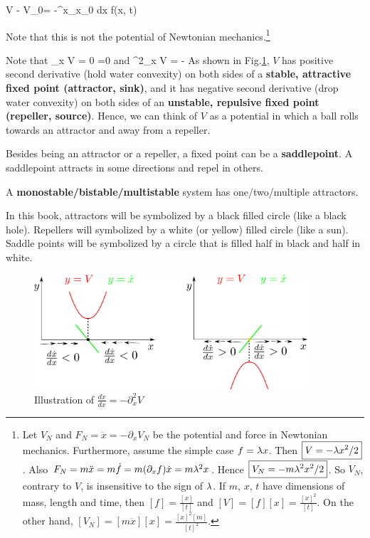 \beq
V - V_0= -\int^x_{x_0} dx \; f(x, t)
\eeq

Note that this is not the potential of Newtonian mechanics.\footnote{Let $V_N$ and $F_N=\ddot{x}=-\partial_x V_N$ be the potential and force in
Newtonian mechanics. Furthermore,
assume the simple case $f=\lambda x$. Then $\boxed{V=-\lambda x^2/2}$. Also
$F_N=m \ddot{x} =m\dot{f}=
m(\partial_x f )\dot{x}=
m\lambda^2 x$. Hence $\boxed{V_N = -m\lambda^2 x^2/2}$.
So $V_N$,
contrary to $V$, is insensitive to the sign of $\lambda$. If $m$, $x$, $t$ have
dimensions of mass, length and time, then
$[f]=\frac{[x]}{[t]}$ and $[V]=[f][x]=\frac{[x]^2}{[t]}$.
On the other hand, $[V_N]=[m\ddot{x}][x]=
\frac{[x]^2[m]}{[t]^2}$.
}



Note that
\beq
\partial_x V = 0 \iff {}=0
\eeq
and
\beq
\partial^2_x V = -
\eeq
As shown in Fig.\ref{fig-V-derivatives},
$V$ has positive second derivative
(hold water convexity)
on both sides of a {\bf stable, attractive fixed  point (attractor, sink)},
and it has negative second derivative
(drop water convexity)
on both sides of an {\bf unstable, repulsive fixed point (repeller, source)}. Hence, we can think of
$V$ as a potential in which a ball rolls towards an attractor
and away from a repeller.

Besides being an attractor or a repeller, a fixed point can be a
{\bf saddlepoint}. A saddlepoint
attracts in some directions and repel in others. 

A {\bf monostable/bistable/multistable}
system has one/two/multiple
attractors.

In this book, attractors will be symbolized by a black filled circle (like a black hole). Repellers will 
symbolized by a white (or yellow)  filled circle (like a sun).
Saddle points will be
symbolized by a circle that
is filled half in black
and half in white.


\begin{figure}[h!]
\centering
\includegraphics[width=4in]
{dynamical-sys/V-derivatives.png}
\caption{Illustration of
$\frac{d\dot{x}}{dx}=-\partial^2_xV$}
\label{fig-V-derivatives}
\end{figure}

